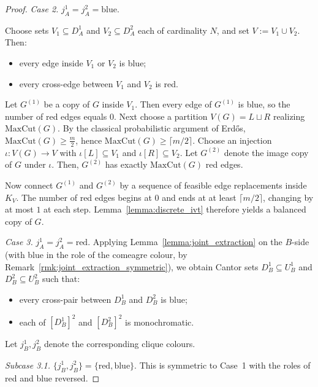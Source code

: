 \begin{proof}
    \medskip
 
    \noindent\textit{Case 2.}
    $j_A^1=j_A^2=\mathrm{blue}$.
 
    Choose sets $V_1\subseteq D_A^1$ and $V_2\subseteq D_A^2$ each of cardinality $N$, and set $V:=V_1\cup V_2$.
    Then:
    \begin{itemize}
        \item every edge inside $V_1$ or $V_2$ is blue;
        \item every cross-edge between $V_1$ and $V_2$ is red.
    \end{itemize}
 
    Let $G^{(1)}$ be a copy of $G$ inside $V_1$.
    Then every edge of $G^{(1)}$ is blue, so the number of red edges equals $0$.
    Next choose a partition $V(G)=L\sqcup R$ realizing $\mathrm{MaxCut}(G)$.
    By the classical probabilistic argument of Erd\H{o}s, $\mathrm{MaxCut}(G)\geq \frac{m}{2}$, hence $\mathrm{MaxCut}(G)\geq \lceil m/2\rceil$.
    Choose an injection $\iota\colon V(G)\to V$ with $\iota[L]\subseteq V_1$ and $\iota[R]\subseteq V_2$.
    Let $G^{(2)}$ denote the image copy of $G$ under $\iota$.
    Then, $G^{(2)}$ has exactly $\mathrm{MaxCut}(G)$ red edges.
 
    Now connect $G^{(1)}$ and $G^{(2)}$ by a sequence of feasible edge replacements inside $K_V$.
    The number of red edges begins at $0$ and ends at at least $\lceil m/2\rceil$, changing by at most $1$ at each step.
    Lemma~\ref{lemma:discrete_ivt} therefore yields a balanced copy of $G$.
 
    \medskip
 
    \noindent\textit{Case 3.}
    $j_A^1=j_A^2=\mathrm{red}$.
    Applying Lemma~\ref{lemma:joint_extraction} on the $B$-side (with blue in the role of the comeagre colour, by Remark~\ref{rmk:joint_extraction_symmetric}), we obtain Cantor sets $D_B^1\subseteq U_B^1$ and $D_B^2\subseteq U_B^2$ such that:
    \begin{itemize}
        \item every cross-pair between $D_B^1$ and $D_B^2$ is blue;
        \item each of $[D_B^1]^2$ and $[D_B^2]^2$ is monochromatic.
    \end{itemize}
 
    Let $j_B^1,j_B^2$ denote the corresponding clique colours.
 
    \medskip
 
    \noindent\textit{Subcase 3.1.}
    $\{j_B^1,j_B^2\}=\{\mathrm{red},\mathrm{blue}\}$.
    This is symmetric to Case~1 with the roles of red and blue reversed.
 

\end{proof}
